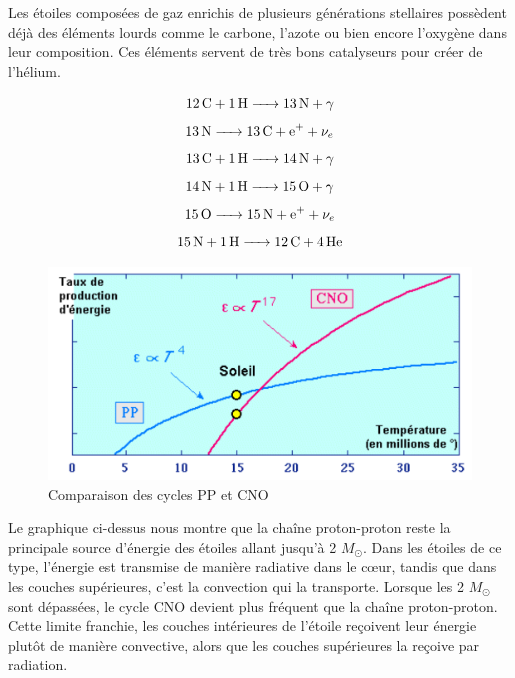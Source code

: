 Les étoiles composées de gaz enrichis de plusieurs générations stellaires possèdent déjà des éléments lourds comme le carbone, l’azote ou bien encore l’oxygène dans leur composition. Ces éléments servent de très bons catalyseurs pour créer de l’hélium.


\begin{equation}\ce{\ce{12C} + \ce{1H} -> \ce{13N} +$\gamma$}\label{Eq. 2.4}\end{equation}				     	
\begin{equation}\ce{\ce{13N} -> \ce{13C} + \ce{e+} + $\nu_{e}$ }\label{Eq. 2.5}\end{equation}					   	
\begin{equation}\ce{\ce{13C} + \ce{1H} -> \ce{14N} + $\gamma$ }\label{Eq. 2.6}\end{equation}	
\begin{equation}\ce{\ce{14N} + \ce{1H} -> \ce{15O} + $\gamma$}\label{Eq. 2.7}\end{equation}\newpage\vspace{2cm}		
\begin{equation}\ce{\ce{15O} -> \ce{15N} + \ce{e+} + $\nu_{e}$	}\label{Eq. 2.8}\end{equation}
\begin{equation}\ce{\ce{15N} + \ce{1H} -> \ce{12C} + \ce{4He}}\label{Eq. 2.9}\end{equation}\smallskip

\begin{figure}[H]
	\centering
	\includegraphics[scale=0.8]{images/cno-pp}
	\caption[Comparaison des cycles PP et CNO\newline\url{http://nrumiano.free.fr/Fetoiles/energie.html}]{Comparaison des cycles PP et CNO}
	\label{Fig. 2.1}
\end{figure}\bigskip

Le graphique ci-dessus nous montre que la chaîne proton-proton reste la principale source d’énergie des étoiles allant jusqu’à 2 $M_\odot$. Dans les étoiles de ce type, l’énergie est transmise de manière radiative dans le cœur, tandis que dans les couches supérieures, c’est la convection qui la transporte. Lorsque les 2 $M_\odot$ sont dépassées, le cycle CNO devient plus fréquent que la chaîne proton-proton. Cette limite franchie, les couches intérieures de l’étoile reçoivent leur énergie plutôt de manière convective, alors que les couches supérieures la reçoive par radiation.

